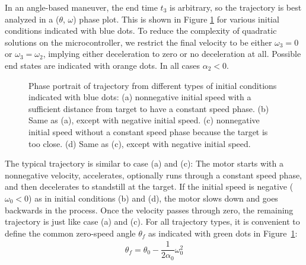 \documentclass[12pt, a4paper]
{article}
\providecommand{\w}{\omega}
\renewcommand{\th}{\theta}
\renewcommand{\a}{\alpha}
\begin{document}
In an angle-based maneuver, the end time $t_3$ is arbitrary, so the trajectory
is best analyzed in a ($\th$, $\w$) phase plot. This is shown in Figure
\ref{fig:positions} for various initial conditions indicated with blue dots.
To reduce the complexity of quadratic solutions on the microcontroller, we
restrict the final velocity to be either $\w_3=0$ or $\w_3=\w_2$, implying
either deceleration to zero or no deceleration at all. Possible end states are
indicated with orange dots. In all cases $\a_2 < 0$.


\begin{figure}[H]
    \centering
    
    \caption{
        Phase portrait of trajectory from different types of initial conditions
        indicated with blue dots:
        (a) nonnegative initial speed with a
        sufficient distance from target to have a constant speed phase.
        (b) Same as (a), except with negative initial speed.
        (c) nonnegative initial speed without a constant speed phase because
        the target is too close.
        (d) Same as (c), except with negative initial speed.
        \label{fig:positions}}
\end{figure}


The typical trajectory is similar to case (a) and (c): The motor starts
with a nonnegative velocity, accelerates, optionally runs through a constant
speed phase, and then decelerates to standstill at the target.
If the initial speed is negative ($\w_0 < 0$) as in initial conditions (b)
and (d), the motor slows down and goes backwards in the process. Once the
velocity passes through zero, the remaining trajectory is just like case (a)
and (c). For all trajectory types, it is convenient to define the common
zero-speed angle $\th_f$ as indicated
with green dots in Figure~\ref{fig:positions}:
%
\begin{align}
    \th_f = \th_0 - \dfrac{1}{2 \a_0}\w_0^2
\end{align}
\end{document}
